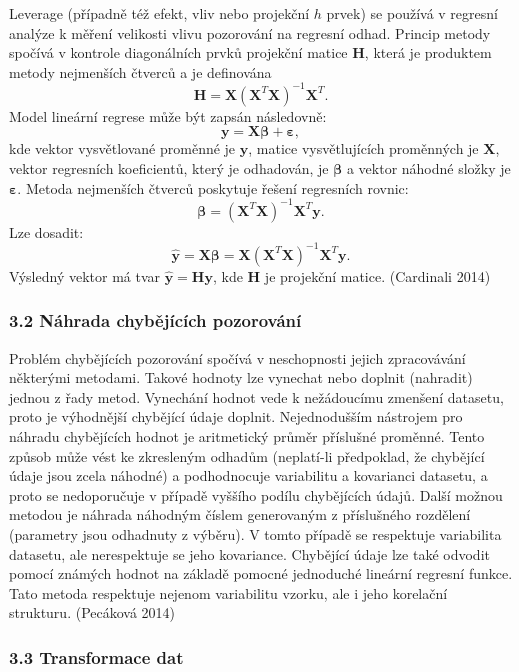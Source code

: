 \documentclass[12pt,]{article}
\begin{document}
\qquad Leverage (případně též efekt, vliv nebo projekční \(h\) prvek) se
používá v regresní analýze k měření velikosti vlivu pozorování na
regresní odhad. Princip metody spočívá v kontrole diagonálních prvků
projekční matice \(\bm{H}\), která je produktem metody nejmenších
čtverců a je definována
\[\bm{H} = \bm{X}(\bm{X}^T\bm{X})^{-1}\bm{X}^T.\] Model lineární regrese
může být zapsán následovně:
\[\bm{y} = \bm{X \beta} + \bm{\varepsilon},\] kde vektor vysvětlované
proměnné je \(\bm{y}\), matice vysvětlujících proměnných je \(\bm{X}\),
vektor regresních koeficientů, který je odhadován, je \(\bm{\beta}\) a
vektor náhodné složky je \(\bm{\varepsilon}\). Metoda nejmenších čtverců
poskytuje řešení regresních rovnic:
\[\bm{\beta} = (\bm{X}^T\bm{X})^{-1} \bm{X}^T \bm{y}.\] Lze dosadit:
\[\hat{\bm{y}} = \bm{X \beta} = \bm{X}(\bm{X}^T\bm{X})^{-1} \bm{X}^T \bm{y}.\]
Výsledný vektor má tvar \(\hat{\bm{y}} = \bm{Hy}\), kde \(\bm{H}\) je
projekční matice. (Cardinali 2014)

\subsubsection{3.2 Náhrada chybějících
pozorování}\label{nahrada-chybejicich-pozorovani}

\qquad Problém chybějících pozorování spočívá v neschopnosti jejich
zpracovávání některými metodami. Takové hodnoty lze vynechat nebo
doplnit (nahradit) jednou z řady metod. Vynechání hodnot vede k
nežádoucímu zmenšení datasetu, proto je výhodnější chybějící údaje
doplnit. Nejednodušším nástrojem pro náhradu chybějících hodnot je
aritmetický průměr příslušné proměnné. Tento způsob může vést ke
zkresleným odhadům (neplatí-li předpoklad, že chybějící údaje jsou zcela
náhodné) a podhodnocuje variabilitu a kovarianci datasetu, a proto se
nedoporučuje v případě vyššího podílu chybějících údajů. Další možnou
metodou je náhrada náhodným číslem generovaným z příslušného rozdělení
(parametry jsou odhadnuty z výběru). V tomto případě se respektuje
variabilita datasetu, ale nerespektuje se jeho kovariance. Chybějící
údaje lze také odvodit pomocí známých hodnot na základě pomocné
jednoduché lineární regresní funkce. Tato metoda respektuje nejenom
variabilitu vzorku, ale i jeho korelační strukturu. (Pecáková 2014)

\subsubsection{3.3 Transformace dat}\label{transformace-dat}
\end{document}
